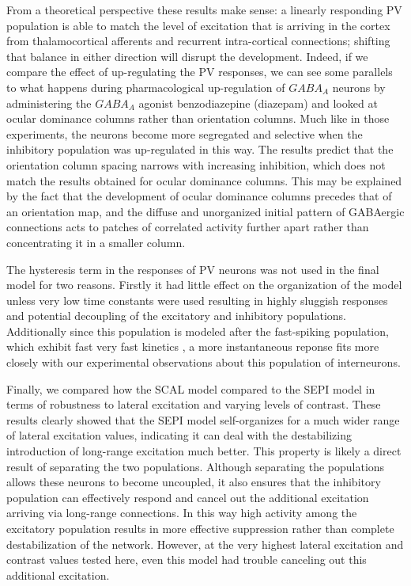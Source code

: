 From a theoretical perspective these results make sense: a linearly
responding PV population is able to match the level of excitation that
is arriving in the cortex from thalamocortical afferents and recurrent
intra-cortical connections; shifting that balance in either direction
will disrupt the development. Indeed, if we compare the effect of
up-regulating the PV responses, we can see some parallels to what
happens during pharmacological up-regulation of $GABA_A$ neurons by
administering the $GABA_A$ agonist benzodiazepine (diazepam)
\citep{Fagiolini2004,Hensch2004} and looked at ocular dominance
columns rather than orientation columns. Much like in those
experiments, the neurons become more segregated and selective when the
inhibitory population was up-regulated in this way. The results
predict that the orientation column spacing narrows with increasing
inhibition, which does not match the results obtained for ocular
dominance columns. This may be explained by the fact that the
development of ocular dominance columns precedes that of an
orientation map, and the diffuse and unorganized initial pattern of
GABAergic connections acts to patches of correlated activity further
apart rather than concentrating it in a smaller column.

The hysteresis term in the responses of PV neurons was not used in the
final model for two reasons. Firstly it had little effect on the
organization of the model unless very low time constants were used
resulting in highly sluggish responses and potential decoupling of the
excitatory and inhibitory populations. Additionally since this
population is modeled after the fast-spiking population, which exhibit
fast very fast kinetics \citep{Cruikshank2007,Gabernet2005}, a more
instantaneous reponse fits more closely with our experimental
observations about this population of interneurons.

Finally, we compared how the SCAL model compared to the SEPI model in
terms of robustness to lateral excitation and varying levels of
contrast. These results clearly showed that the SEPI model
self-organizes for a much wider range of lateral excitation values,
indicating it can deal with the destabilizing introduction of
long-range excitation much better. This property is likely a direct
result of separating the two populations. Although separating the
populations allows these neurons to become uncoupled, it also ensures
that the inhibitory population can effectively respond and cancel out
the additional excitation arriving via long-range connections. In this
way high activity among the excitatory population results in more
effective suppression rather than complete destabilization of the
network. However, at the very highest lateral excitation and contrast
values tested here, even this model had trouble canceling out this
additional excitation.

